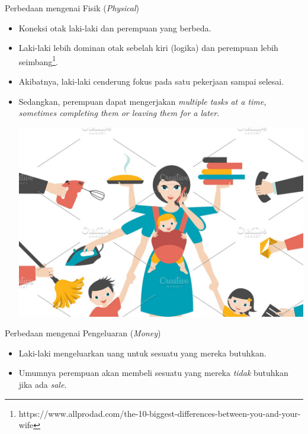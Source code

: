 \documentclass{beamer}
\theoremstyle{mystyle}
\begin{document}
\begin{frame}{Perbedaan mengenai Fisik (\textit{Physical})}
	\begin{itemize}
		\item<2-> Koneksi otak laki-laki dan perempuan yang berbeda.
		\hfill \break
		\item<3-> Laki-laki lebih dominan otak sebelah kiri (logika) dan perempuan lebih seimbang\footnote{https://www.allprodad.com/the-10-biggest-differences-between-you-and-your-wife}.
		\hfill \break
		\item<4-> Akibatnya, laki-laki cenderung fokus pada satu pekerjaan sampai selesai.
		\hfill \break		
		\item<5-> Sedangkan, perempuan dapat mengerjakan \textit{multiple tasks at a time, sometimes completing them or leaving them for a later}.
		\begin{center}
	\includegraphics[scale=.1]{multitask-woman}			
		\end{center}
	\end{itemize}
\end{frame}

\begin{frame}{Perbedaan mengenai Pengeluaran (\textit{Money})}
	\begin{itemize}
		\item Laki-laki mengeluarkan uang untuk sesuatu yang mereka butuhkan.
		\hfill \break
		\item<2-> Umumnya perempuan akan membeli sesuatu yang mereka \textit{tidak} butuhkan jika ada \textit{sale}.
	\end{itemize}
\end{frame}
\end{document}

